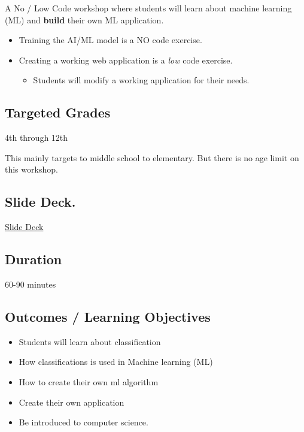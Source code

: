 \documentclass[
]{report}
\providecommand{\tightlist}{%
  \setlength{\itemsep}{0pt}\setlength{\parskip}{0pt}}\usepackage{longtable,booktabs,array}
\begin{document}
A No / Low Code workshop where students will learn about machine
learning (ML) and \textbf{build} their own ML application.

\begin{itemize}
\tightlist
\item
  Training the AI/ML model is a NO code exercise.\\
\item
  Creating a working web application is a \emph{low} code exercise.

  \begin{itemize}
  \tightlist
  \item
    Students will modify a working application for their needs.
  \end{itemize}
\end{itemize}

\hypertarget{targeted-grades}{%
\subsection{Targeted Grades}\label{targeted-grades}}

4th through 12th

This mainly targets to middle school to elementary. But there is no age
limit on this workshop.

\hypertarget{slide-deck.}{%
\subsection{Slide Deck.}\label{slide-deck.}}

\href{https://ejboettcher.github.io/gemcityML-No-CodeAI/slide_deck.html\#/title-slide}{Slide
Deck}

\hypertarget{duration}{%
\subsection{Duration}\label{duration}}

60-90 minutes

\hypertarget{outcomes-learning-objectives}{%
\subsection{Outcomes / Learning
Objectives}\label{outcomes-learning-objectives}}

\begin{itemize}
\tightlist
\item
  Students will learn about classification
\item
  How classifications is used in Machine learning (ML)
\item
  How to create their own ml algorithm
\item
  Create their own application
\item
  Be introduced to computer science.
\end{itemize}
\end{document}
